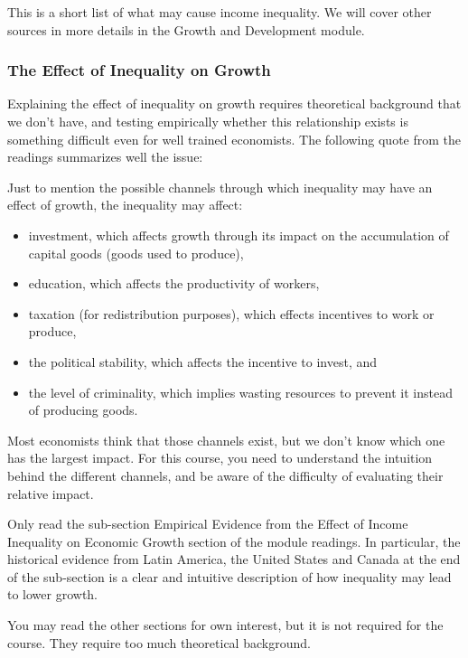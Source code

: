\documentclass[letterpaper]{article}\usepackage[]{graphicx}\usepackage[]{color}
\numberwithin{exer}{section}
\theoremstyle{nonumberplain}
\begin{document}
This is a short list of what may cause income inequality. We will
cover other sources in more details in the Growth and Development
module.

\subsubsection*{The Effect of Inequality on Growth}

Explaining the effect of inequality on growth requires theoretical
background that we don't have, and testing empirically whether this
relationship exists is something difficult even for well trained
economists. The following quote from the readings summarizes well the
issue:


Just to mention the possible channels through which inequality may have
an effect of growth, the inequality may affect:

\begin{itemize}
\item investment, which affects growth through its impact on the
  accumulation of capital goods (goods used to produce),
\item education, which affects the productivity of workers,
\item taxation (for redistribution purposes), which effects incentives
  to work or produce,
\item the political stability, which affects the incentive to invest, and
\item the level of criminality, which implies wasting resources to
  prevent it instead of producing goods.
\end{itemize}

Most economists think that those channels exist, but we don't know
which one has the largest impact. For this course, you need to
understand the intuition behind the different channels, and be aware
of the difficulty of evaluating their relative impact.

\begin{important}
Only read the sub-section Empirical Evidence from the Effect of Income
Inequality on Economic Growth section of the module readings. In
particular, the historical evidence from Latin America, the United
States and Canada at the end of the sub-section is a clear and
intuitive description of how inequality may lead to lower growth.

You may read the other sections for own interest, but it is not
required for the course. They require too much theoretical background.
  \end{important}
\end{document}

